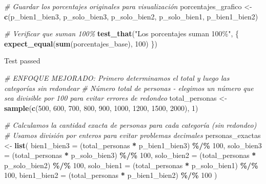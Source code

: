 \documentclass[
]{article}
\newenvironment{Shaded}{\begin{snugshade}}{\end{snugshade}}
\newcommand{\AttributeTok}[1]{\textcolor[rgb]{0.13,0.29,0.53}{#1}}
\newcommand{\CommentTok}[1]{\textcolor[rgb]{0.56,0.35,0.01}{\textit{#1}}}
\newcommand{\DecValTok}[1]{\textcolor[rgb]{0.00,0.00,0.81}{#1}}
\newcommand{\FunctionTok}[1]{\textcolor[rgb]{0.13,0.29,0.53}{\textbf{#1}}}
\newcommand{\NormalTok}[1]{#1}
\newcommand{\OtherTok}[1]{\textcolor[rgb]{0.56,0.35,0.01}{#1}}
\newcommand{\SpecialCharTok}[1]{\textcolor[rgb]{0.81,0.36,0.00}{\textbf{#1}}}
\newcommand{\StringTok}[1]{\textcolor[rgb]{0.31,0.60,0.02}{#1}}
\begin{document}
\begin{Shaded}
\begin{Highlighting}[]
\CommentTok{\# Guardar los porcentajes originales para visualización}
\NormalTok{porcentajes\_grafico }\OtherTok{\textless{}{-}} \FunctionTok{c}\NormalTok{(p\_bien1\_bien3, p\_solo\_bien3, p\_solo\_bien2, p\_solo\_bien1, p\_bien1\_bien2)}

\CommentTok{\# Verificar que suman 100\%}
\FunctionTok{test\_that}\NormalTok{(}\StringTok{"Los porcentajes suman 100\%"}\NormalTok{, \{}
  \FunctionTok{expect\_equal}\NormalTok{(}\FunctionTok{sum}\NormalTok{(porcentajes\_base), }\DecValTok{100}\NormalTok{)}
\NormalTok{\})}
\end{Highlighting}
\end{Shaded}

Test passed

\begin{Shaded}
\begin{Highlighting}[]
\CommentTok{\# ENFOQUE MEJORADO: Primero determinamos el total y luego las categorías sin redondear}
\CommentTok{\# Número total de personas {-} elegimos un número que sea divisible por 100 para evitar errores de redondeo}
\NormalTok{total\_personas }\OtherTok{\textless{}{-}} \FunctionTok{sample}\NormalTok{(}\FunctionTok{c}\NormalTok{(}\DecValTok{500}\NormalTok{, }\DecValTok{600}\NormalTok{, }\DecValTok{700}\NormalTok{, }\DecValTok{800}\NormalTok{, }\DecValTok{900}\NormalTok{, }\DecValTok{1000}\NormalTok{, }\DecValTok{1200}\NormalTok{, }\DecValTok{1500}\NormalTok{, }\DecValTok{2000}\NormalTok{), }\DecValTok{1}\NormalTok{)}

\CommentTok{\# Calculamos la cantidad exacta de personas para cada categoría (sin redondeo)}
\CommentTok{\# Usamos división por enteros para evitar problemas decimales}
\NormalTok{personas\_exactas }\OtherTok{\textless{}{-}} \FunctionTok{list}\NormalTok{(}
  \AttributeTok{bien1\_bien3 =}\NormalTok{ (total\_personas }\SpecialCharTok{*}\NormalTok{ p\_bien1\_bien3) }\SpecialCharTok{\%/\%} \DecValTok{100}\NormalTok{,}
  \AttributeTok{solo\_bien3 =}\NormalTok{ (total\_personas }\SpecialCharTok{*}\NormalTok{ p\_solo\_bien3) }\SpecialCharTok{\%/\%} \DecValTok{100}\NormalTok{,}
  \AttributeTok{solo\_bien2 =}\NormalTok{ (total\_personas }\SpecialCharTok{*}\NormalTok{ p\_solo\_bien2) }\SpecialCharTok{\%/\%} \DecValTok{100}\NormalTok{,}
  \AttributeTok{solo\_bien1 =}\NormalTok{ (total\_personas }\SpecialCharTok{*}\NormalTok{ p\_solo\_bien1) }\SpecialCharTok{\%/\%} \DecValTok{100}\NormalTok{,}
  \AttributeTok{bien1\_bien2 =}\NormalTok{ (total\_personas }\SpecialCharTok{*}\NormalTok{ p\_bien1\_bien2) }\SpecialCharTok{\%/\%} \DecValTok{100}
\NormalTok{)}


\end{Highlighting}
\end{Shaded}
\end{document}
